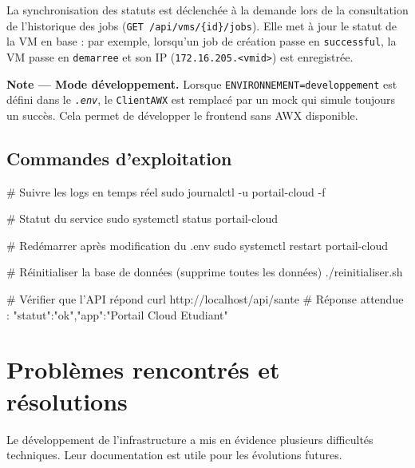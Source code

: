 \documentclass[a4paper]{article}
\newcommand{\cmd}[1]{\texttt{#1}}
\newcommand{\file}[1]{\texttt{\textit{#1}}}
\begin{document}
La synchronisation des statuts est déclenchée à la demande lors de la consultation de l'historique des jobs (\cmd{GET /api/vms/\{id\}/jobs}). Elle met à jour le statut de la VM en base : par exemple, lorsqu'un job de création passe en \cmd{successful}, la VM passe en \cmd{demarree} et son IP (\cmd{172.16.205.<vmid>}) est enregistrée.

\begin{infobox}
  \textbf{Note --- Mode développement.} Lorsque \cmd{ENVIRONNEMENT=developpement} est défini dans le \file{.env}, le \cmd{ClientAWX} est remplacé par un mock qui simule toujours un succès. Cela permet de développer le frontend sans AWX disponible.
\end{infobox}

\subsection{Commandes d'exploitation}

\begin{bashcode}
# Suivre les logs en temps réel
sudo journalctl -u portail-cloud -f

# Statut du service
sudo systemctl status portail-cloud

# Redémarrer après modification du .env
sudo systemctl restart portail-cloud

# Réinitialiser la base de données (supprime toutes les données)
./reinitialiser.sh

# Vérifier que l'API répond
curl http://localhost/api/sante
# Réponse attendue : {"statut":"ok","app":"Portail Cloud Etudiant"}
\end{bashcode}


\section{Problèmes rencontrés et résolutions}
\label{sec:problemes}

Le développement de l'infrastructure a mis en évidence plusieurs difficultés techniques. Leur documentation est utile pour les évolutions futures.
\end{document}
